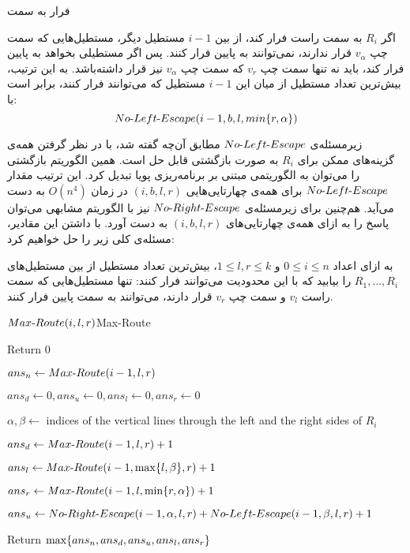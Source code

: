  فرار به سمت 

اگر $R_{i}$ به سمت راست فرار کند، از بین $i - 1$ مستطیل دیگر، مستطیل‌هایی که سمت چپ $v_{\alpha}$ قرار ندارند، نمی‌توانند به پایین فرار کنند. پس اگر مستطیلی بخواهد به پایین فرار کند، باید نه تنها سمت چپ $v_{r}$ که سمت چپ $v_{\alpha}$ نیز قرار داشته‌باشد. به این ترتیب، بیش‌ترین تعداد مستطیل از میان این $i - 1$ مستطیل که می‌توانند فرار کنند، برابر است با:
$$No \mbox{-} Left \mbox{-} Escape(i - 1, b, l, min{\{ r, \alpha \}})$$


زیر‌مسئله‌ی $No \mbox{-} Left \mbox{-} Escape$ مطابق آن‌چه گفته شد، با در نظر گرفتن همه‌ی گزینه‌های ممکن برای $R_{i}$ به صورت بازگشتی قابل حل است. همین الگوریتم بازگشتی را می‌توان به الگوریتمی مبتنی بر برنامه‌ریزی پویا تبدیل کرد. این ترتیب مقدار $No \mbox{-} Left \mbox{-} Escape$ برای همه‌ی چهارتایی‌هایی $(i, b, l, r)$ در زمان $O(n ^ 4)$ به دست می‌آید. هم‌چنین برای زیر‌مسئله‌ی $No \mbox{-} Right \mbox{-} Escape$ نیز با الگوریتم مشابهی می‌توان پاسخ را به ازای همه‌ی چهارتایی‌های $(i, b, l, r)$ به دست آورد. با داشتن این مقادیر، مسئله‌ی کلی زیر را حل خواهیم کرد:

\label{prob:Max-Routing-Dynamic}

به ازای اعداد $0 \leq i \leq n$ و $1 \leq l, r \leq k$، بیش‌ترین تعداد مستطیل از بین مستطیل‌های $R_{1}, \ldots, R_{i}$ را بیابید که با این محدودیت می‌توانند فرار کنند: تنها مستطیل‌هایی که سمت راست $v_{l}$ و سمت چپ $v_{r}$ قرار دارند، می‌توانند به سمت پایین فرار کنند.


\begin{alg}{$Max \mbox{-} Route(i, l, r)$}{Max-Route}
		
		\State Return $0$
	\EndIf

	\State $ans_{n} \leftarrow Max \mbox{-} Route(i - 1, l, r)$

	\State $ans_{d} \leftarrow 0, ans_{u} \leftarrow 0, ans_{l} \leftarrow 0, ans_{r} \leftarrow 0$

	\State $\alpha, \beta \leftarrow$ indices of the vertical lines through the left and the right sides of $R_{i}$
	
		\State $ans_{d} \leftarrow Max \mbox{-} Route(i - 1, l, r) + 1$ 
	\EndIf

		\State $ans_{l} \leftarrow Max \mbox{-} Route(i - 1, \max\!{\{ l, \beta \}}, r) + 1$ 
	\EndIf

		\State $ans_{r} \leftarrow Max \mbox{-} Route(i - 1, l, \min\!{\{ r, \alpha \}}) + 1$ 
	\EndIf

		\State $ans_{u} \leftarrow No \mbox{-} Right \mbox{-} Escape(i - 1, \alpha, l, r) + No \mbox{-} Left \mbox{-} Escape  (i - 1, \beta, l, r)  + 1$
	\EndIf

	\State Return $\max\!{\{ ans_{n}, ans_{d}, ans_{u}, ans_{l}, ans_{r} \}}$

\end{alg}

